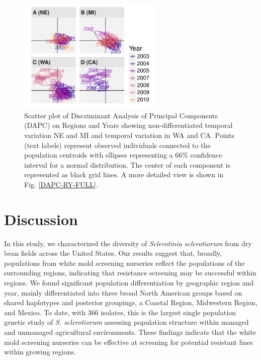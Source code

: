 \documentclass[fleqn,10pt,lineno]{wlpeerj} %
\theoremstyle{definition}
\theoremstyle{definition}
\theoremstyle{definition}
\theoremstyle{remark}
\begin{document}
\begin{figure}
\centering
\includegraphics[width=0.61000\textwidth]{../../results/figures/publication/Fig6.pdf}
\caption{Scatter plot of Discriminant Analysis of Principal Components
(DAPC) on Regions and Years showing non-differentiated temporal
variation NE and MI and temporal variation in WA and CA. Points (text
labels) represent observed individuals connected to the population
centroids with ellipses representing a 66\% confidence interval for a
normal distribution. The center of each component is represented as
black grid lines. A more detailed view is shown in Fig.
\ref{DAPC-RY-FULL}.}\label{DAPC-RY}
\end{figure}

\section*{Discussion}\label{discussion}

In this study, we characterized the diversity of \emph{Sclerotinia
sclerotiorum} from dry bean fields across the United States. Our results
suggest that, broadly, populations from white mold screening nurseries
reflect the populations of the surrounding regions, indicating that
resistance screening may be successful within regions. We found
significant population differentiation by geographic region and year,
mainly differentiated into three broad North American groups based on
shared haplotypes and posterior groupings, a Coastal Region, Midwestern
Region, and Mexico. To date, with 366 isolates, this is the largest
single population genetic study of \emph{S. sclerotiorum} assessing
population structure within managed and unmanaged agricultural
environments. These findings indicate that the white mold screening
nurseries can be effective at screening for potential resistant lines
within growing regions.
\end{document}
